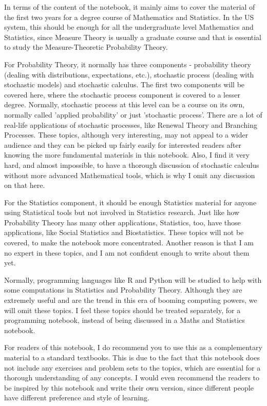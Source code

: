\documentclass[11pt, a4paper, oneside]{book}
\theoremstyle{definition}
\begin{document}
\noindent In terms of the content of the notebook, it mainly aims to cover the material of the first two years for a degree course of Mathematics and Statistics. In the US system, this should be enough for all the undergraduate level Mathematics and Statistics, since Measure Theory is usually a graduate course and that is essential to study the Measure-Theoretic Probability Theory. 

\noindent For Probability Theory, it normally has three components - probability theory (dealing with distributions, expectations, etc.), stochastic process (dealing with stochastic models) and stochastic calculus. The first two components will be covered here, where the stochastic process component is covered to a lesser degree. Normally, stochastic process at this level can be a course on its own, normally called 'applied probability' or just 'stochastic process'. There are a lot of real-life applications of stochastic processes, like Renewal Theory and Branching Processes. These topics, although very interesting, may not appeal to a wider audience and they can be picked up fairly easily for interested readers after knowing the more fundamental materials in this notebook. Also, I find it very hard, and almost impossible, to have a thorough discussion of stochastic calculus without more advanced Mathematical tools, which is why I omit any discussion on that here. 

\noindent For the Statistics component, it should be enough Statistics material for anyone using Statistical tools but not involved in Statistics research. Just like how Probability Theory has many other applications, Statistics, too, have those applications, like Social Statistics and Biostatistics. These topics will not be covered, to make the notebook more concentrated. Another reason is that I am no expert in these topics, and I am not confident enough to write about them yet. 

\noindent Normally, programming languages like R and Python will be studied to help with some computations in Statistics and Probability Theory. Although they are extremely useful and are the trend in this era of booming computing powers, we will omit these topics. I feel these topics should be treated separately, for a programming notebook, instead of being discussed in a Maths and Statistics notebook. 

\noindent For readers of this notebook, I do recommend you to use this as a complementary material to a standard textbooks. This is due to the fact that this notebook does not include any exercises and problem sets to the topics, which are essential for a thorough understanding of any concepts. I would even recommend the readers to be inspired by this notebook and write their own version, since different people have different preference and style of learning. 
\end{document}
